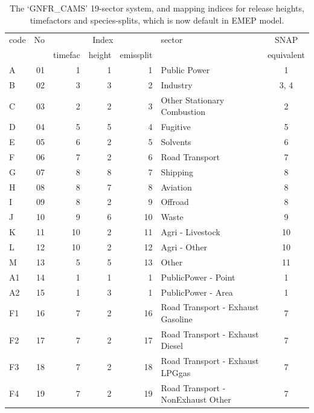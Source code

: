 \small{
\begin{longtable}{lrrrrlc}
\caption{The `GNFR\_CAMS' 19-sector system, and mapping indices for release heights, timefactors and species-splits,
 which is now
 default in EMEP model. \label{tab:GNFRsectors}
}\\
\hline
code & No  & \multicolumn{3}{c}{Index}      & sector & SNAP\\ \cline{3-5}
     &         & timefac  & height & emissplit  &        & equivalent \\
\hline
A &      01 &   1 &  1 &   1 &  Public Power  &  1 \\
B &      02 &   3 &  3 &   2 &  Industry  & 3, 4 \\
C &      03 &   2 &  2 &   3 &  Other Stationary Combustion & 2 \\
D &      04 &   5 &  5 &   4 &  Fugitive & 5 \\ %
E &      05 &   6 &  2 &   5 &  Solvents & 6 \\
F &      06 &   7 &  2 &   6 &  Road Transport & 7 \\
G &      07 &   8 &  8 &   7 &  Shipping & 8  \\ %
H &      08 &   8 &  7 &   8 &  Aviation & 8  \\
I &      09 &   8 &  2 &   9 &  Offroad & 8  \\
J &     10 &   9 &  6 &  10 &  Waste & 9 \\
K &     11 &  10 &  2 &  11 &  Agri - Livestock & 10 \\
L &     12 &  10 &  2 &  12 &  Agri - Other & 10 \\
M &     13 &   5 &  5 &  13 &  Other & 11 \\
A1 &    14 &   1 &  1 &   1 &  PublicPower - Point & 1 \\
A2 &    15 &   1 &  3 &   1 &  PublicPower - Area & 1 \\
F1 &    16 &   7 &  2 &  16 &  Road Transport - Exhaust Gasoline & 7  \\
F2 &    17 &   7 &  2 &  17 &  Road Transport - Exhaust Diesel& 7   \\
F3 &    18 &   7 &  2 &  18 &  Road Transport - Exhaust LPGgas & 7  \\
F4 &    19 &   7 &  2 &  19 &  Road Transport - NonExhaust Other& 7   \\
\hline
\end{longtable}}
\normalsize

